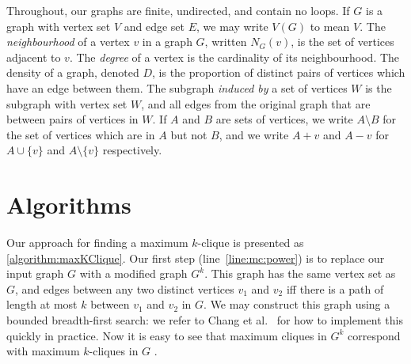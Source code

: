 \documentclass[letterpaper]{article}
\newcommand{\mcline}[1]{line~\ref{line:mc:#1}}
\newcommand{\vertexset}{V}
\newcommand{\neighbourhood}{N}
\begin{document}
Throughout, our graphs are finite, undirected, and contain no loops. If $G$ is a graph with vertex
set $V$ and edge set $E$, we may write $\vertexset(G)$ to mean $V$. The \emph{neighbourhood} of a
vertex $v$ in a graph $G$, written $\neighbourhood_G(v)$, is the set of vertices adjacent to $v$.
The \emph{degree} of a vertex is the cardinality of its neighbourhood. The density of a graph,
denoted $D$, is the proportion of distinct pairs of vertices which have an edge between them. The
subgraph \emph{induced by} a set of vertices $W$ is the subgraph with vertex set $W$, and all edges
from the original graph that are between pairs of vertices in $W$. If $A$ and $B$ are sets of
vertices, we write $A \setminus B$ for the set of vertices which are in $A$ but not $B$, and we
write $A + v$ and $A - v$ for $A \cup \{v\}$ and $A \setminus \{v\}$ respectively.

\section{Algorithms}

Our approach for finding a maximum $k$-clique is presented as \cref{algorithm:maxKClique}. Our first
step (\mcline{power}) is to replace our input graph $G$ with a modified graph $G^k$. This graph has
the same vertex set as $G$, and edges between any two distinct vertices $v_1$ and $v_2$ iff there is
a path of length at most $k$ between $v_1$ and $v_2$ in $G$. We may construct this graph using a
bounded breadth-first search: we refer to Chang et al.\ \cite{Chang:2013} for how to implement this
quickly in practice. Now it is easy to see that maximum cliques in $G^k$ correspond with maximum
$k$-cliques in $G$ \cite{Balasundaram:2005}.
\end{document}
